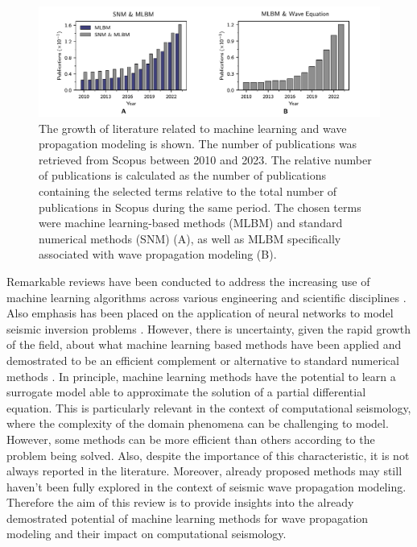 \documentclass[11pt,twoside]{article}
\begin{document}
\begin{figure}[H]
\centering
    \includegraphics[width=1.0\textwidth]{figs/publications_year.pdf}
    \caption{The growth of literature related to machine learning and wave propagation modeling is shown. 
    The number of publications was retrieved from Scopus between 2010 and 2023. The relative number of publications 
    is calculated as the number of publications containing the selected terms relative to the total number of 
    publications in Scopus during the same period. The chosen terms were machine learning-based methods (MLBM) 
    and standard numerical methods (SNM) (A), as well as MLBM specifically associated with wave propagation 
    modeling (B).} 
    \label{fig:publications_absolute_relative}
\end{figure}

Remarkable reviews have been conducted to address the increasing use of machine learning algorithms across various 
engineering and scientific disciplines \citep{vadyala_review_2022,deng_physics-informed_2023,lino_current_2023}. 
Also emphasis has been placed on the application of neural networks to model seismic inversion problems 
\citep{jingbo_research_2023}. However, there is uncertainty, given the rapid growth of the field, about what 
machine learning based methods have been applied and demostrated to be an efficient complement or alternative 
to standard numerical methods \citep{grossmann_can_2023,mcgreivy_weak_2024}. In principle, machine learning 
methods have the potential to learn a surrogate model able to approximate the solution of a partial differential 
equation. This is particularly relevant in the context of computational seismology, where the complexity 
of the domain phenomena can be challenging to model. However, some methods can be more efficient than others 
according to the problem being solved. Also, despite the importance of this characteristic, it is not always 
reported in the literature. Moreover, already proposed methods may still haven't been fully explored
in the context of seismic wave propagation modeling. Therefore the aim of this review is to provide insights 
into the already demostrated potential of machine learning methods for wave propagation modeling and their 
impact on computational seismology.
\end{document}
